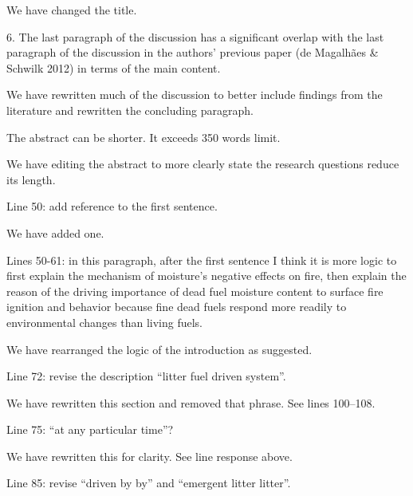 \documentclass[letterpaper, 12pt]{letter}
\begin{document}
\begin{letter}{}
We have changed the title.

\begin{quoting}
  6. The last paragraph of the discussion has a significant overlap with the
  last paragraph of the discussion in the authors’ previous paper (de Magalhães
  \& Schwilk 2012) in terms of the main content.
\end{quoting}

We have rewritten much of the discussion to better include findings from the
literature and rewritten the concluding paragraph.

\begin{quoting}
The abstract can be shorter. It exceeds 350 words limit. 
\end{quoting}

We have editing the abstract to more clearly state the research questions
reduce its length.

\begin{quoting}
Line 50: add reference to the first sentence.
\end{quoting}

We have added one.

\begin{quoting}
  Lines 50-61: in this paragraph, after the first sentence I think it is more
  logic to first explain the mechanism of moisture’s negative effects on fire,
  then explain the reason of the driving importance of dead fuel moisture
  content to surface fire ignition and behavior because fine dead fuels respond
  more readily to environmental changes than living fuels.
\end{quoting}

We have rearranged the logic of the introduction as suggested.

\begin{quoting}
Line 72: revise the description ``litter fuel driven system''.
\end{quoting}

We have rewritten this section and removed that phrase. See lines 100--108.

\begin{quoting}
Line 75: “at any particular time”?
\end{quoting}

We have rewritten this for clarity. See line response above.

\begin{quoting}
Line 85: revise ``driven by by'' and ``emergent litter litter''.
\end{quoting}


\end{letter}
\end{document}
